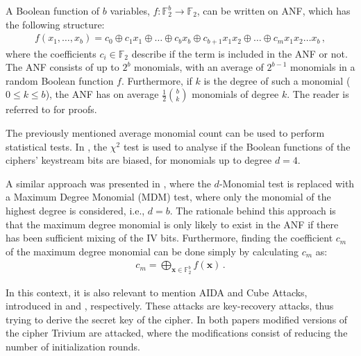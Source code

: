 A Boolean function of $b$ variables, $f \colon \mathbb{F}_2^b \to \mathbb{F}_2$, can be written on ANF, which has the following structure:
\begin{align*}
	f(x_1, \ldots, x_b) = c_0 \oplus c_1 x_1 \oplus \ldots \oplus c_b x_b \oplus c_{b+1} x_1 x_2 \oplus \ldots \oplus c_m x_1 x_2 \ldots x_b \,,
\end{align*}
where the coefficients $c_i \in \mathbb{F}_2$ describe if the term is included in the ANF or not.
The ANF consists of up to $2^b$ monomials, with an average of $2^{b-1}$ monomials in a random Boolean function $f$.
Furthermore, if $k$ is the degree of such a monomial ($0 \le k \le b$), the ANF has on average $\frac{1}{2} {\binom{b}{k}}$ monomials of degree $k$.
The reader is referred to \cite{filiol:2002} for proofs.

The previously mentioned average monomial count can be used to perform statistical tests.
In \cite{saarinen:2006}, the $\chi^2$ test is used to analyse if the Boolean functions of the ciphers' keystream bits are biased, for monomials up to degree $d=4$.

A similar approach was presented in \cite{englund:2007}, where the $d$-Monomial test is replaced with a Maximum Degree Monomial (MDM) test, where only the monomial of the highest degree is considered, i.e., $d=b$.
The rationale behind this approach is that the maximum degree monomial is only likely to exist in the ANF if there has been sufficient mixing of the IV bits.
Furthermore, finding the coefficient $c_m$ of the maximum degree monomial can be done simply by calculating $c_m$ as:
\begin{align}
	c_m = \bigoplus_{\bm{x} \in \mathbb{F}^b_2}^{} f(\bm{x}) \,.
\end{align}

In this context, it is also relevant to mention AIDA and Cube Attacks, introduced in \cite{vielhaber:2007} and \cite{dinur:2009}, respectively.
These attacks are key-recovery attacks, thus trying to derive the secret key of the cipher.
In both papers modified versions of the cipher Trivium \cite{canniere:2006} are attacked, where the modifications consist of reducing the number of initialization rounds.

